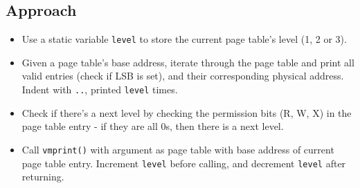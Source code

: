\documentclass[11pt,a4paper,english]{paper}
\begin{document}
\subsection{Approach}
\begin{itemize}[noitemsep, nolistsep]
    \item Use a static variable \texttt{level} to store the current page table's level (1, 2 or 3).
    \item Given a page table's base address, iterate through the page table and print all valid entries (check if LSB is set), and their corresponding physical address. Indent with \texttt{..}, printed \texttt{level} times.
    \item Check if there's a next level by checking the permission bits (R, W, X) in the page table entry - if they are all 0s, then there is a next level.
    \item Call \texttt{vmprint()} with argument as page table with base address of current page table entry. Increment \texttt{level} before calling, and decrement \texttt{level} after returning.
\end{itemize}



%
%
\end{document}
